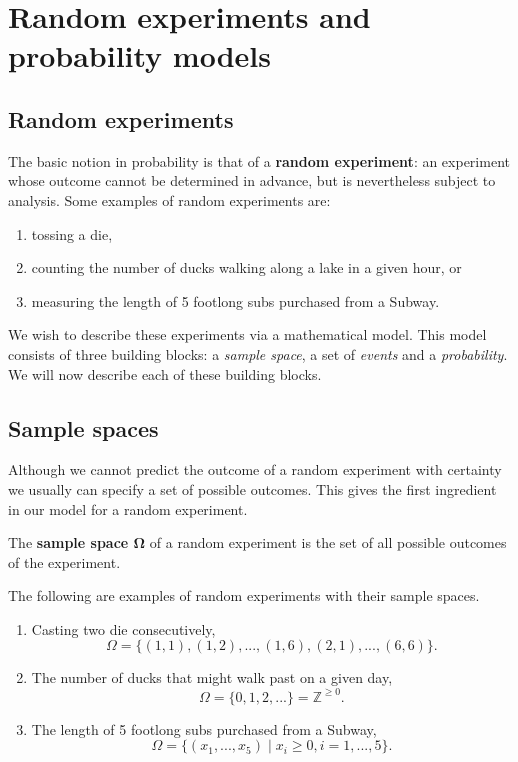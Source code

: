 \chapter[Random experiments and probability models]{Random experiments and \\ probability models}

\section{Random experiments}

The basic notion in probability is that of a 
\textbf{random experiment}: an experiment whose outcome 
cannot be determined in advance, but is nevertheless 
subject to analysis. Some examples of random experiments are: 

\begin{enumerate}
    \item tossing a die, 
    \item counting the number of ducks walking along a lake in a given hour, or
    \item measuring the length of 5 footlong subs purchased from a Subway.
\end{enumerate}

We wish to describe these experiments via a mathematical 
model. This model consists of three building blocks: 
a \textit{sample space}, a set of \textit{events} and 
a \textit{probability}. We will now describe each of these building blocks. 

\section{Sample spaces}

Although we cannot predict the outcome of a random experiment 
with certainty we usually can specify a set of possible outcomes. 
This gives the first ingredient in our model for a random experiment. 

\begin{definition}\label{defn:sample space}
    The \textbf{sample space $\boldsymbol\Omega$} of a random experiment 
    is the set of all possible outcomes of the experiment.
\end{definition}

The following are examples of random experiments with their sample spaces. 

\begin{enumerate}
    \item Casting two die consecutively, \[\Omega = \{(1,1),(1,2), ..., (1,6),(2,1),...,(6,6)\}.\]
    \item The number of ducks that might walk past on a given day, \[\Omega =\{0,1,2,...\} = \mathbb{Z}^{\geq 0}.\]
    \item The length of 5 footlong subs purchased from a Subway, \[\Omega = \{(x_1,...,x_5)\mid x_i\geq0, i=1,...,5\}.\]
\end{enumerate}

